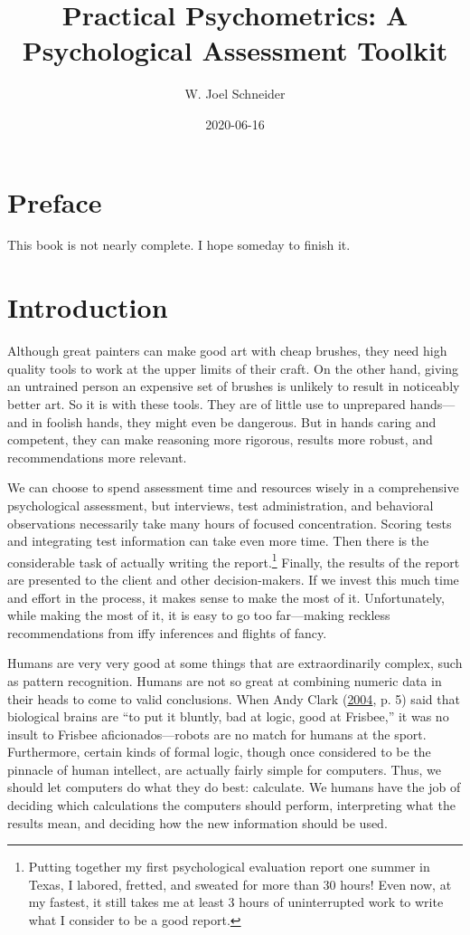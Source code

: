 \documentclass[
]{book}
\title{Practical Psychometrics: A Psychological Assessment Toolkit}
\author{W. Joel Schneider}
\date{2020-06-16}
\begin{document}
\maketitle

{
\setcounter{tocdepth}{1}
\tableofcontents
}
\hypertarget{preface}{%
\chapter*{Preface}\label{preface}}

This book is not nearly complete. I hope someday to finish it.

\hypertarget{intro}{%
\chapter{Introduction}\label{intro}}

Although great painters can make good art with cheap brushes, they need high quality tools to work at the upper limits of their craft. On the other hand, giving an untrained person an expensive set of brushes is unlikely to result in noticeably better art. So it is with these tools. They are of little use to unprepared hands---and in foolish hands, they might even be dangerous. But in hands caring and competent, they can make reasoning more rigorous, results more robust, and recommendations more relevant.

We can choose to spend assessment time and resources wisely in a comprehensive psychological assessment, but interviews, test administration, and behavioral observations necessarily take many hours of focused concentration. Scoring tests and integrating test information can take even more time. Then there is the considerable task of actually writing the report.\footnote{Putting together my first psychological evaluation report one summer in Texas, I labored, fretted, and sweated for more than 30 hours! Even now, at my fastest, it still takes me at least 3 hours of uninterrupted work to write what I consider to be a good report.} Finally, the results of the report are presented to the client and other decision-makers. If we invest this much time and effort in the process, it makes sense to make the most of it. Unfortunately, while making the most of it, it is easy to go too far---making reckless recommendations from iffy inferences and flights of fancy.

Humans are very very good at some things that are extraordinarily complex, such as pattern recognition. Humans are not so great at combining numeric data in their heads to come to valid conclusions. When Andy Clark (\protect\hyperlink{ref-clark2004natural}{2004}, p. 5) said that biological brains are ``to put it bluntly, bad at logic, good at Frisbee,'' it was no insult to Frisbee aficionados---robots are no match for humans at the sport. Furthermore, certain kinds of formal logic, though once considered to be the pinnacle of human intellect, are actually fairly simple for computers. Thus, we should let computers do what they do best: calculate. We humans have the job of deciding which calculations the computers should perform, interpreting what the results mean, and deciding how the new information should be used.
\end{document}
